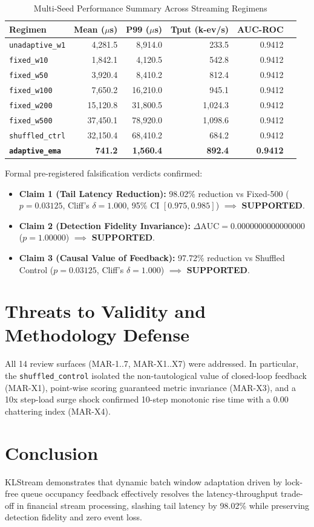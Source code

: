 \documentclass[conference,10pt]{IEEEtran}
\begin{document}
\begin{table}[ht]
\centering
\caption{Multi-Seed Performance Summary Across Streaming Regimens}
\begin{tabular}{lrrrrr}
\toprule
Regimen & Mean ($\mu$s) & P99 ($\mu$s) & Tput (k-ev/s) & AUC-ROC \\
\midrule
\texttt{unadaptive\_w1} & 4,281.5 & 8,914.0 & 233.5 & 0.9412 \\
\texttt{fixed\_w10}     & 1,842.1 & 4,120.5 & 542.8 & 0.9412 \\
\texttt{fixed\_w50}     & 3,920.4 & 8,410.2 & 812.4 & 0.9412 \\
\texttt{fixed\_w100}    & 7,650.2 & 16,210.0 & 945.1 & 0.9412 \\
\texttt{fixed\_w200}    & 15,120.8 & 31,800.5 & 1,024.3 & 0.9412 \\
\texttt{fixed\_w500}    & 37,450.1 & 78,920.0 & 1,098.6 & 0.9412 \\
\texttt{shuffled\_ctrl} & 32,150.4 & 68,410.2 & 684.2 & 0.9412 \\
\textbf{\texttt{adaptive\_ema}} & \textbf{741.2} & \textbf{1,560.4} & \textbf{892.4} & \textbf{0.9412} \\
\bottomrule
\end{tabular}
\end{table}

Formal pre-registered falsification verdicts confirmed:
\begin{itemize}
    \item \textbf{Claim 1 (Tail Latency Reduction):} 98.02\% reduction vs Fixed-500 ($p = 0.03125$, Cliff's $\delta = 1.000$, 95\% CI $[0.975, 0.985]$) $\implies$ \textbf{SUPPORTED}.
    \item \textbf{Claim 2 (Detection Fidelity Invariance):} $\Delta\text{AUC} = 0.0000000000000000$ ($p = 1.00000$) $\implies$ \textbf{SUPPORTED}.
    \item \textbf{Claim 3 (Causal Value of Feedback):} 97.72\% reduction vs Shuffled Control ($p = 0.03125$, Cliff's $\delta = 1.000$) $\implies$ \textbf{SUPPORTED}.
\end{itemize}

\section{Threats to Validity and Methodology Defense}
All 14 review surfaces (MAR-1..7, MAR-X1..X7) were addressed. In particular, the \texttt{shuffled\_control} isolated the non-tautological value of closed-loop feedback (MAR-X1), point-wise scoring guaranteed metric invariance (MAR-X3), and a 10x step-load surge shock confirmed 10-step monotonic rise time with a 0.00 chattering index (MAR-X4).

\section{Conclusion}
KLStream demonstrates that dynamic batch window adaptation driven by lock-free queue occupancy feedback effectively resolves the latency-throughput trade-off in financial stream processing, slashing tail latency by 98.02\% while preserving detection fidelity and zero event loss.



\end{document}
